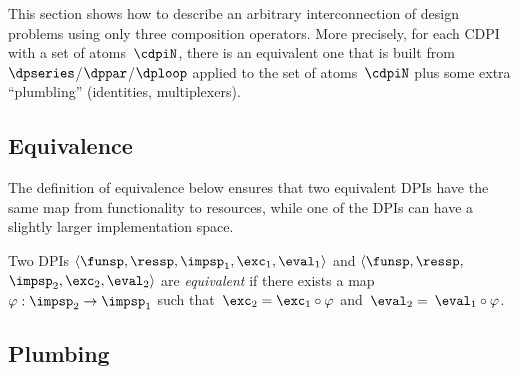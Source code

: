 \label{sec:Decomposing2}This section shows how to describe an arbitrary
interconnection of design problems using only three composition operators.
More precisely, for each CDPI with a set of atoms~$\cdpiN$, there
is an equivalent one that is built from $\dpseries$/$\dppar$/$\dploop$
applied to the set of atoms~$\cdpiN$ plus some extra ``plumbling''
(identities, multiplexers).

\subsection{Equivalence}

The definition of equivalence below ensures that two equivalent DPIs
have the same map from functionality to resources, while one of the
DPIs can have a slightly larger implementation space.
\begin{definition}
Two DPIs $\left\langle \funsp,\ressp,\impsp_{1},\exc_{1},\eval_{1}\right\rangle $
and $\langle\funsp,\ressp,$ $\impsp_{2},\exc_{2},\eval_{2}\rangle$
are \emph{equivalent} if there exists a map~$\varphi:\impsp_{2}\rightarrow\impsp_{1}$
such that~$\exc_{2}=\exc_{1}\circ\varphi$ and~$\eval_{2}=$ $\eval_{1}\circ\varphi$.
\end{definition}

\subsection{Plumbing}

